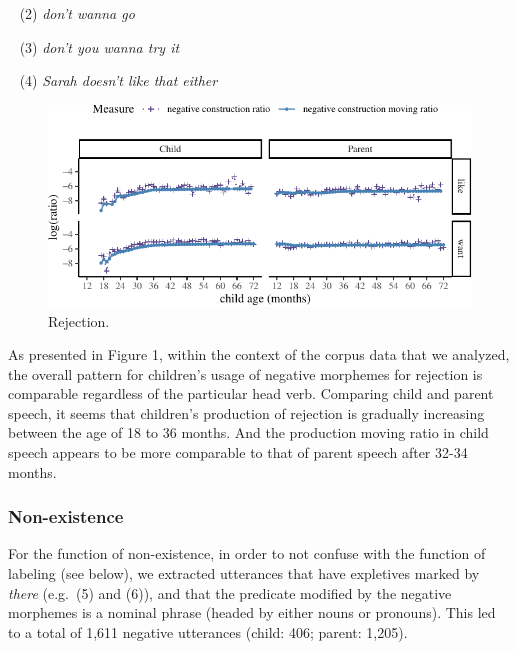 \documentclass[10pt, letterpaper]{article}
\newenvironment{CodeChunk}{}{}
\begin{document}
~ (2) \emph{don't wanna go}

~ (3) \emph{don't you wanna try it}

~ (4) \emph{Sarah doesn't like that either}

\begin{figure}[h]

\begin{CodeChunk}


\begin{center}\includegraphics{figs/emotion-1} \end{center}

\end{CodeChunk}
\caption[This image spans both columns]{Rejection.}\label{fig:rejection}
\end{figure}

As presented in Figure 1, within the context of the corpus data that we
analyzed, the overall pattern for children's usage of negative morphemes
for rejection is comparable regardless of the particular head verb.
Comparing child and parent speech, it seems that children's production
of rejection is gradually increasing between the age of 18 to 36 months.
And the production moving ratio in child speech appears to be more
comparable to that of parent speech after 32-34 months.

\hypertarget{non-existence}{%
\subsubsection{Non-existence}\label{non-existence}}

For the function of non-existence, in order to not confuse with the
function of labeling (see below), we extracted utterances that have
expletives marked by \emph{there} (e.g.~(5) and (6)), and that the
predicate modified by the negative morphemes is a nominal phrase (headed
by either nouns or pronouns). This led to a total of 1,611 negative
utterances (child: 406; parent: 1,205).
\end{document}
